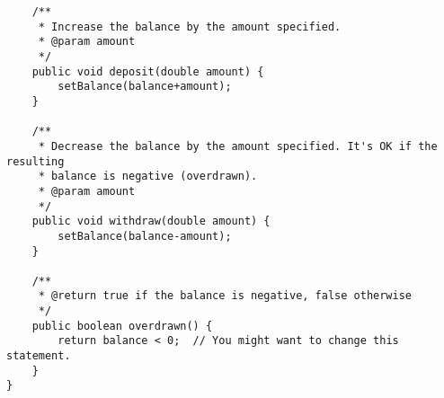 \begin{questions}
\begin{solution}
\begin{lstlisting}
	/**
	 * Increase the balance by the amount specified.
	 * @param amount
	 */
	public void deposit(double amount) {
		setBalance(balance+amount);
	}

	/**
	 * Decrease the balance by the amount specified. It's OK if the resulting
	 * balance is negative (overdrawn).
	 * @param amount
	 */
	public void withdraw(double amount) {
		setBalance(balance-amount);
	}

	/**
	 * @return true if the balance is negative, false otherwise
	 */
	public boolean overdrawn() {
		return balance < 0;  // You might want to change this statement.
	}
}
\end{lstlisting}
\end{solution}
\end{questions}

